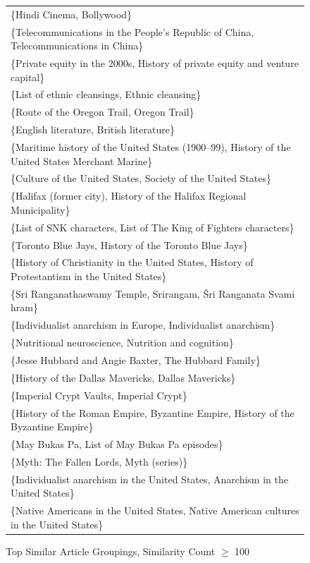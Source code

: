 \documentclass{acm_proc_article-sp}
\begin{document}
\begin{figure}[hp!]
\centering
\caption{Top Similar Article Groupings, Similarity Count $\ge$ 100}
{\small
\begin{tabular}{| l |}
    \hline
\{Hindi Cinema, Bollywood\} \\
\{Telecommunications in the People's Republic of China, Telecommunications in China\} \\
\{Private equity in the 2000s, History of private equity and venture capital\} \\
\{List of ethnic cleansings, Ethnic cleansing\} \\
\{Route of the Oregon Trail, Oregon Trail\} \\
\{English literature, British literature\} \\
\{Maritime history of the United States (1900–99), History of the United States Merchant Marine\} \\
\{Culture of the United States, Society of the United States\} \\
\{Halifax (former city), History of the Halifax Regional Municipality\} \\
\{List of SNK characters, List of The King of Fighters characters\} \\
\{Toronto Blue Jays, History of the Toronto Blue Jays\} \\
\{History of Christianity in the United States, History of Protestantism in the United States\} \\
\{Sri Ranganathaswamy Temple, Srirangam, Šri Ranganata Svami hram\} \\
\{Individualist anarchism in Europe, Individualist anarchism\} \\
\{Nutritional neuroscience, Nutrition and cognition\} \\
\{Jesse Hubbard and Angie Baxter, The Hubbard Family\} \\
\{History of the Dallas Mavericks, Dallas Mavericks\} \\
\{Imperial Crypt Vaults, Imperial Crypt\} \\
\{History of the Roman Empire, Byzantine Empire, History of the Byzantine Empire\} \\
\{May Bukas Pa, List of May Bukas Pa episodes\} \\
\{Myth: The Fallen Lords, Myth (series)\} \\
\{Individualist anarchism in the United States, Anarchism in the United States\} \\
\{Native Americans in the United States, Native American cultures in the United States\} \\

\end{tabular}}
\end{figure}
\end{document}
